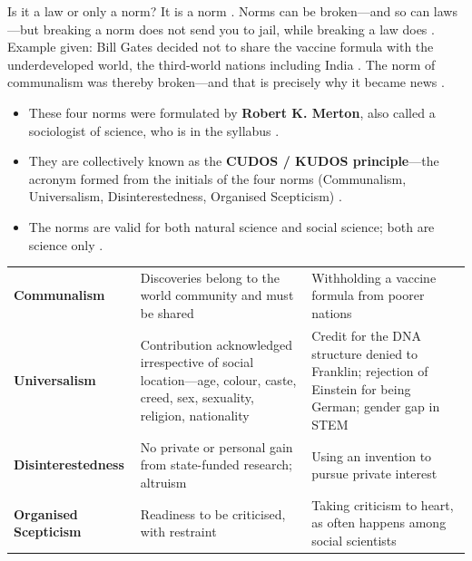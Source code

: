 \begin{CriticalPoint}
Is it a law or only a norm? It is a norm . Norms can be broken---and so can laws---but breaking a norm does not send you to jail, while breaking a law does . Example given: Bill Gates decided not to share the vaccine formula with the underdeveloped world, the third-world nations including India . The norm of communalism was thereby broken---and that is precisely why it became news .
\end{CriticalPoint}

\begin{KeyConcept}
\begin{itemize}
    \item These four norms were formulated by \textbf{Robert K. Merton}, also called a sociologist of science, who is in the syllabus .
    \item They are collectively known as the \textbf{CUDOS / KUDOS principle}---the acronym formed from the initials of the four norms (Communalism, Universalism, Disinterestedness, Organised Scepticism) .
    \item The norms are valid for both natural science and social science; both are science only .
\end{itemize}
\end{KeyConcept}

\vspace{6pt}
\noindent
\begin{tabularx}{\textwidth}{p{3.2cm} Y Y}
\toprule
{}
 &  &  \\
\midrule
\textbf{Communalism} & Discoveries belong to the world community and must be shared & Withholding a vaccine formula from poorer nations  \\
\textbf{Universalism} & Contribution acknowledged irrespective of social location---age, colour, caste, creed, sex, sexuality, religion, nationality & Credit for the DNA structure denied to Franklin; rejection of Einstein for being German; gender gap in STEM  \\
\textbf{Disinterestedness} & No private or personal gain from state-funded research; altruism & Using an invention to pursue private interest  \\
\textbf{Organised Scepticism} & Readiness to be criticised, with restraint & Taking criticism to heart, as often happens among social scientists  \\
\bottomrule
\end{tabularx}
\vspace{6pt}

